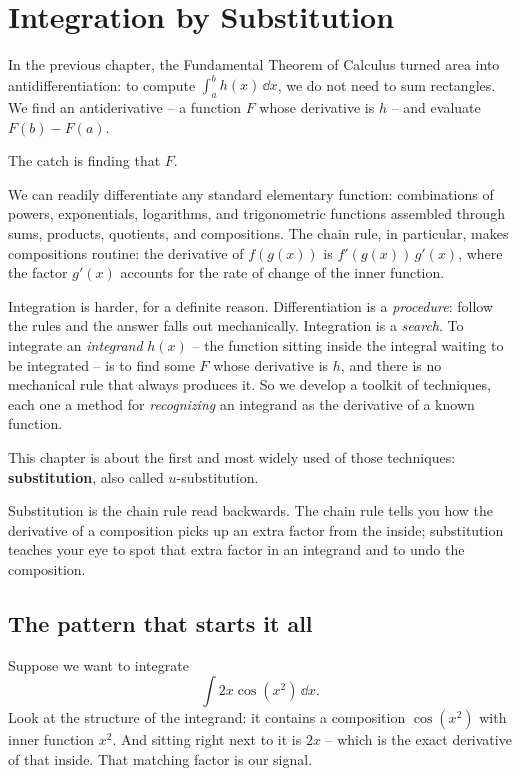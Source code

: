 \chapter{Integration by Substitution}

In the previous chapter, the Fundamental Theorem of Calculus turned area into
antidifferentiation: to compute $\int_a^b h(x)\,\dd x$, we do not need to sum
rectangles. We find an antiderivative -- a function $F$ whose derivative is $h$ --
and evaluate $F(b) - F(a)$.

The catch is finding that $F$.

We can readily differentiate any standard elementary function: combinations of
powers, exponentials, logarithms, and trigonometric functions assembled through sums,
products, quotients, and compositions. The chain rule, in particular, makes compositions
routine: the derivative of $f(g(x))$ is $f'(g(x))\,g'(x)$, where the factor $g'(x)$ accounts
for the rate of change of the inner function.

Integration is harder, for a definite reason. Differentiation is
a \emph{procedure}: follow the rules and the answer falls out mechanically. Integration is a
\emph{search}. To integrate an \emph{integrand} $h(x)$ -- the function sitting inside the
integral waiting to be integrated -- is to find some $F$ whose derivative is $h$, and
there is no mechanical rule that always produces it. So we develop a toolkit of
techniques, each one a method for \emph{recognizing} an integrand as
the derivative of a known function.

This chapter is about the first and most widely used of those techniques:
\textbf{substitution}, also called $u$-substitution.

\begin{focusbox}
Substitution is the chain rule read backwards. The chain rule tells you how the
derivative of a composition picks up an extra factor from the inside; substitution
teaches your eye to spot that extra factor in an integrand and to undo the
composition.
\end{focusbox}

\chapterline

\section{The pattern that starts it all}
\label{ch22:the-pattern}

Suppose we want to integrate
\[
  \int 2x\cos\!\left(x^2\right)\,\dd x.
\]
Look at the structure of the integrand: it contains a composition $\cos(x^2)$ with inner function $x^2$.
And sitting right next to it is $2x$ -- which is the exact derivative of that
inside. That matching factor is our signal.

